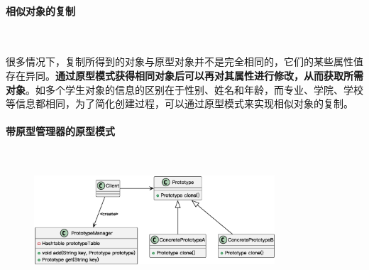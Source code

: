 \paragraph*{相似对象的复制}~{} \par
很多情况下，复制所得到的对象与原型对象并不是完全相同的，它们的某些属性值存在异同。\textbf{通过原型模式获得相同对象后可以再对其属性进行修改，从而获取所需对象}。如多个学生对象的信息的区别在于性别、姓名和年龄，而专业、学院、学校等信息都相同，为了简化创建过程，可以通过原型模式来实现相似对象的复制。

\paragraph*{带原型管理器的原型模式}~{} \par
\begin{figure}[H]
    \vspace{-0.5em}
	\centering
	\includegraphics[width=0.8\textwidth]{images/原型模式拓展.eps}
    \vspace{-1em}
\end{figure}